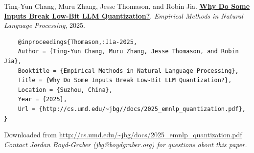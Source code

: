 \documentclass[a4paper]{article}
\begin{document}
    Ting-Yun Chang, Muru Zhang, Jesse Thomason, and Robin Jia.  {\bf \href{http://cs.umd.edu/~jbg//docs/2025_emnlp_quantization.pdf}{Why Do Some Inputs Break Low-Bit LLM Quantization?}}.  \emph{Empirical Methods in Natural Language Processing}, 2025.



    \vspace{5cm}

    \begin{verbatim}
    @inproceedings{Thomason,:Jia-2025,
	Author = {Ting-Yun Chang, Muru Zhang, Jesse Thomason, and Robin Jia},
	Booktitle = {Empirical Methods in Natural Language Processing},
	Title = {Why Do Some Inputs Break Low-Bit LLM Quantization?},
	Location = {Suzhou, China},
	Year = {2025},
	Url = {http://cs.umd.edu/~jbg//docs/2025_emnlp_quantization.pdf},
}

    \end{verbatim}

    

    

    

    \vspace{3cm}
    Downloaded from \url{http://cs.umd.edu/~jbg/docs/2025_emnlp_quantization.pdf}  \\

    \vspace{2cm}
    \textit{Contact Jordan Boyd-Graber (jbg@boydgraber.org) for questions about this paper.}

    

    
\end{document}
